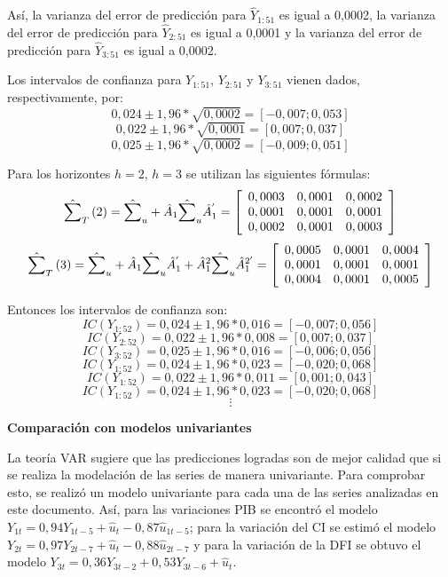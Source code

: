 As\'{i}, la varianza del error de predicci\'{o}n para $\hat{Y}_{1:51}$ es igual a 0,0002, la varianza del error de predicci\'{o}n para $\hat{Y}_{2:51}$ es igual a 0,0001 y la varianza del error de predicci\'{o}n para $\hat{Y}_{3:51}$ es igual a 0,0002.\newline

Los intervalos de confianza para $Y_{1:51}$, $Y_{2:51}$ y $Y_{3:51}$ vienen dados, respectivamente, por:
\[
0,024\pm 1,96\ast \sqrt {0,0002} =\left[ -0,007;0,053 \right]
\]
\[
0,022\pm 1,96\ast \sqrt {0,0001} =\left[ 0,007;0,037 \right]
\]
\[
0,025\pm 1,96\ast \sqrt {0,0002} =\left[ -0,009;0,051 \right]
\]

Para los horizontes $h=2$, $h=3$ se utilizan las siguientes f\'{o}rmulas:
\[
\hat{\sum }_{T}\left( 2 \right)=\hat{\sum }_{u}+\hat{A}_{1}\hat{\sum}_{u}\hat{A}_{1}^{'}=\left[ {\begin{array}{*{20}c}
0,0003 & 0,0001 & 0,0002\\
0,0001 & 0,0001 & 0,0001\\
0,0002 & 0,0001 & 0,0003\\
\end{array} } \right]
\]
\[
\hat{\sum }_{T}\left( 3 \right)=\hat{\sum }_{u}+\hat{A}_{1}\hat{\sum}_{u}\hat{A}_{1}^{'}+\hat{A}_{1}^{2}\hat{\sum }_{u}\hat{A}_{1}^{2'}=\left[ 
{\begin{array}{*{20}c}
0,0005 & 0,0001 & 0,0004\\
0,0001 & 0,0001 & 0,0001\\
0,0004 & 0,0001 & 0,0005\\
\end{array} } \right]
\]

Entonces los intervalos de confianza son:
\[
IC\left( Y_{1:52} \right)=0,024\pm 1,96\ast 0,016=\left[-0,007;0,056 \right]
\]
\[
IC\left( Y_{2:52} \right)=0,022\pm 1,96\ast 0,008=\left[0,007;0,037 \right]
\]
\[
IC\left( Y_{3:52} \right)=0,025\pm 1,96\ast 0,016=\left[-0,006;0,056 \right]
\]
\[
IC\left( Y_{1:52} \right)=0,024\pm 1,96\ast 0,023=\left[-0,020;0,068 \right]
\]
\[
IC\left( Y_{1:52} \right)=0,022\pm 1,96\ast 0,011=\left[0,001;0,043 \right]
\]
\[
IC\left( Y_{1:52} \right)=0,024\pm 1,96\ast 0,023=\left[-0,020;0,068 \right]
\]
\[
\vdots 
\]

\textbf{Comparaci\'{o}n con modelos univariantes}\newline

La teor\'{i}a VAR sugiere que las predicciones logradas son de mejor calidad que si se realiza la modelaci\'{o}n de las series de manera univariante. Para comprobar esto, se realiz\'{o} un modelo univariante para cada una de las series analizadas en este documento. As\'{i}, para las variaciones PIB se encontr\'{o} el modelo $Y_{1t}=0,94Y_{1t-5}+\hat{u}_{t}-0,87\hat{u}_{1t-5}$; para la variaci\'{o}n del CI se estim\'{o} el modelo $Y_{2t}=0,97Y_{2t-7}+\hat{u}_{t}-0,88\hat{u}_{2t-7}$ y para la variaci\'{o}n de la DFI se obtuvo el modelo $Y_{3t}=0,36Y_{3t-2}+0,53Y_{3t-6}+\hat{u}_{t}$. 

